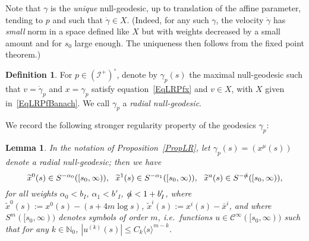 \documentclass[reqno,11pt,letterpaper]{amsart}
\numberwithin{equation}{section}
\numberwithin{figure}{section}
\newtheorem{lemma}[thm]{Lemma}
\theoremstyle{definition}
\newtheorem{definition}[thm]{Definition}
\theoremstyle{remark}
\newcommand{\mc}{\mathcal}
\newcommand{\cC}{\mc C}
\newcommand{\ms}{\mathscr}
\newcommand{\scri}{\ms I}
\newcommand{\N}{\mathbb{N}}
\newcommand{\slalpha}{\slashed{\alpha}{}}
\newcommand{\la}{\langle}
\newcommand{\ra}{\rangle}
\newcommand{\wt}{\widetilde}
\newcommand{\CI}{\cC^\infty}
\newcommand{\usref}[1]{{\upshape\ref{#1}}}
\begin{document}
Note that $\gamma$ is the \emph{unique} null-geodesic, up to translation of the affine parameter, tending to $p$ and such that $\dot\gamma\in X$. (Indeed, for any such $\gamma$, the velocity $\dot\gamma$ has \emph{small} norm in a space defined like $X$ but with weights decreased by a small amount and for $s_0$ large enough. The uniqueness then follows from the fixed point theorem.)

\begin{definition}
\label{DefLR}
  For $p\in(\scri^+)^\circ$, denote by $\gamma_p(s)$ the maximal null-geodesic such that $v=\dot\gamma_p$ and $x=\gamma_p$ satisfy equation~\eqref{EqLRPfx} and $v\in X$, with $X$ given in~\eqref{EqLRPfBanach}. We call $\gamma_p$ a \emph{radial null-geodesic}.
\end{definition}

We record the following stronger regularity property of the geodesics $\gamma_p$:
\begin{lemma}
\label{LemmaLRSymb}
  In the notation of Proposition~\usref{PropLR}, let $\gamma_p(s)=(x^\mu(s))$ denote a radial null-geodesic; then we have
  \[
    \wt x^0(s) \in S^{-\alpha_0}([s_0,\infty)),\ \ 
    \wt x^1(s) \in S^{-\alpha_1}([s_0,\infty)),\ \ 
    \wt x^a(s) \in S^{-\slalpha}([s_0,\infty)),
  \]
  for all weights $\alpha_0<b_I$, $\alpha_1<b'_I$, $\slalpha<1+b'_I$, where $\wt x^0(s):=x^0(s)-(s+4 m\log s)$, $\wt x^i(s):=x^i(s)-\bar x^i$, and where $S^m([s_0,\infty))$ denotes symbols of order $m$, i.e.\ functions $u\in\CI([s_0,\infty))$ such that for any $k\in\N_0$, $|u^{(k)}(s)|\leq C_k\la s\ra^{m-k}$.
\end{lemma}
\end{document}
